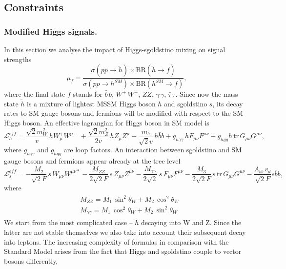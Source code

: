 \documentclass[10pt]{article}
\begin{document}
\subsection{Constraints}
\subsubsection{Modified Higgs signals.}
\noindent
In this section we analyse the impact of Higgs-sgoldstino mixing on signal strengths
\begin{equation}
\label{signal}
\mu_f = \frac{\sigma(pp \rightarrow \tilde{h}) \times \text{BR}(\tilde{h} \rightarrow f)}{\sigma(pp \rightarrow h^{SM}) \times \text{BR}(h^{SM} \rightarrow f)},
\end{equation}
where the final state $f$ stands for $\bar{b} \, b$, $W^+ \, W^-$, $ZZ$, $\gamma \, \gamma$, $\bar{\tau} \, \tau$. 
Since now the mass state $\tilde{h}$ is a mixture of lightest MSSM Higgs boson $h$ and sgoldstino $s$, its decay rates to SM gauge bosons and fermions will be modified with respect to the SM Higgs boson. An effective lagrangian for Higgs boson in SM model is
\begin{equation}
\label{no22}
\mathcal{L}_{h}^{eff} = \frac{\sqrt{2} m_W^2}{v} \, h W_{\mu}^+ W^{\mu -} + \frac{\sqrt{2} m_Z^2}{2v} \, h Z_{\mu} Z^{\mu} - \frac{m_b}{\sqrt{2}v} \, h \bar{b} b + g_{h \gamma \gamma} \, h F_{\mu \nu} F^{\mu \nu} + g_{hgg} h \, \text{tr} \, G_{\mu \nu} G^{\mu \nu},
\end{equation}
where $g_{h \gamma \gamma}$ and $g_{hgg}$ are loop factors.
An interaction between sgoldstino and SM gauge bosons and fermions appear already at the tree level
\begin{equation}
\label{no23}
\mathcal{L}_{s}^{eff} = 	-\frac{M_2}{\sqrt{2}F} \, s \, W_{\mu \nu} W^{\mu \nu *} -\frac{M_{ZZ}}{2\sqrt{2}F} \, s \, Z_{\mu \nu} Z^{\mu \nu} - \frac{M_{\gamma \gamma}}{2\sqrt{2}}  \, s \, F_{\mu \nu} F^{\mu \nu} - \frac{M_3}{2\sqrt{2}F} \, s \, \text{tr} \, G_{\mu \nu} G^{\mu \nu} - \frac{A_{bb} \, v_d}{\sqrt{2}F} s \bar{b} b,
\end{equation}
where
\begin{eqnarray}
\label{no24}
\begin{aligned}
& M_{ZZ} = M_1 \, \sin^2 \theta_W + M_2 \, \cos^2 \theta_W \\
& M_{\gamma \gamma} = M_1 \, \cos^2 \theta_W + M_2 \, \sin^2 \theta_W
\end{aligned}
\end{eqnarray}
We start from the most complicated case -- $\tilde{h}$ decaying into W and Z. Since the latter are not stable themselves we also take into account their subsequent decay into leptons. The increasing complexity of formulas in comparison with the Standard Model arises from the fact that Higgs and sgoldstino couple to vector bosons differently,
\end{document}
